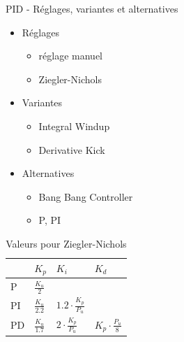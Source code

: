 \documentclass{beamer}
\begin{document}
		\begin{frame}{PID - Réglages, variantes et alternatives}
			\begin{minipage}{.45\textwidth}			
                \begin{itemize}
                    \item Réglages
                        \begin{itemize}
                            \item réglage manuel
                            \item Ziegler-Nichols
                        \end{itemize}
                    \item Variantes
                        \begin{itemize}
                            \item Integral Windup
                            \item Derivative Kick
                        \end{itemize}
                    \item Alternatives
                        \begin{itemize}
                            \item Bang Bang Controller
                            \item P, PI 
                        \end{itemize}
                \end{itemize}
			\end{minipage}
			\begin{minipage}{.45\textwidth}
                \begin{table}[]
                \centering
                \caption{Valeurs pour Ziegler-Nichols}
                \begin{tabular}{|l|l|l|l|}
                \hline
                   & $K_{p}$             & $K_{i}$                         & $K_{d}$                       \\ \hline
                P  & $\frac{K_{u}}{2}$   &                                 &                               \\ \hline
                PI & $\frac{K_{u}}{2.2}$ & $1.2\cdot\frac{K_{p}}{P_{u}}$ &                               \\ \hline
                PD & $\frac{K_{u}}{1.7}$ & $2\cdot\frac{K_{p}}{P_{u}}$   & $K_{p}\cdot\frac{P_{u}}{8}$ \\ \hline
                \end{tabular}
                \end{table}
			\end{minipage}
		\end{frame}
\end{document}
